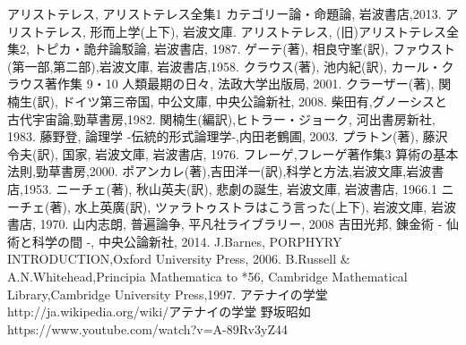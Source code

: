 \begin{thebibliography}{99}
アリストテレス, アリストテレス全集1 カテゴリー論・命題論, 岩波書店,2013.
アリストテレス, 形而上学(上下), 岩波文庫.
アリストテレス, (旧)アリストテレス全集2, トピカ・詭弁論駁論, 岩波書店, 1987.
ゲーテ(著), 相良守峯(訳), ファウスト(第一部,第二部),岩波文庫, 岩波書店,1958.
クラウス(著), 池内紀(訳), 
カール・クラウス著作集 9・10 人類最期の日々, 法政大学出版局, 2001.
クラーザー(著), 関楠生(訳), ドイツ第三帝国, 中公文庫, 中央公論新社, 2008.
柴田有,グノーシスと古代宇宙論,勁草書房,1982.
関楠生(編訳),ヒトラー・ジョーク, 河出書房新社, 1983.
藤野登, 論理学 -伝統的形式論理学-,内田老鶴圃, 2003.
プラトン(著), 藤沢 令夫(訳), 国家, 岩波文庫, 岩波書店, 1976.
フレーゲ,フレーゲ著作集3 算術の基本法則,勁草書房,2000.
ポアンカレ(著),吉田洋一(訳),科学と方法,岩波文庫,岩波書店,1953. 
ニーチェ(著), 秋山英夫(訳), 悲劇の誕生, 岩波文庫, 岩波書店, 1966.1
ニーチェ(著), 水上英廣(訳), ツァラトゥストラはこう言った(上下), 
岩波文庫, 岩波書店, 1970.
山内志朗, 普遍論争, 平凡社ライブラリー, 2008
吉田光邦, 錬金術 - 仙術と科学の間 -, 中央公論新社, 2014.
J.Barnes, PORPHYRY INTRODUCTION,Oxford University Press, 2006.
B.Russell \& A.N.Whitehead,Principia Mathematica to *56,
Cambridge Mathematical Library,Cambridge University Press,1997.
アテナイの学堂 
http://ja.wikipedia.org/wiki/アテナイの学堂
野坂昭如
https://www.youtube.com/watch?v=A-89Rv3yZ44
\end{thebibliography}


